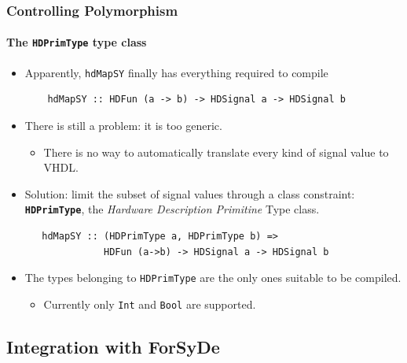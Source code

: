\documentclass{beamer}
\begin{document}
\begin{frame}[fragile]
  \frametitle{Controlling Polymorphism}
  \framesubtitle{The \texttt{\textbf{HDPrimType}} type class}
  \begin{itemize}
    
  \item Apparently, \texttt{hdMapSY} finally has everything required to 
    compile
      \begin{lstlisting}
    hdMapSY :: HDFun (a -> b) -> HDSignal a -> HDSignal b
      \end{lstlisting}
  \pause
\item There is still a problem: it is too generic.
  \begin{itemize}
    \item There is no way to automatically translate every kind of
      signal value to VHDL.
    \end{itemize}
  \pause
  \item Solution: limit the subset of signal values through a class
    constraint: \texttt{\textbf{HDPrimType}}, the \textit{Hardware
      Description Primitine} Type class.
    
\begin{lstlisting}
   hdMapSY :: (HDPrimType a, HDPrimType b) => 
              HDFun (a->b) -> HDSignal a -> HDSignal b
\end{lstlisting}
\pause
\item The types belonging to \texttt{HDPrimType} are the only ones
  suitable to be compiled.
\begin{itemize}  
\item Currently only \texttt{Int} and \texttt{Bool} are supported.
\end{itemize}

\end{itemize}  
\end{frame}

\subsection{Integration with ForSyDe}
\end{document}
